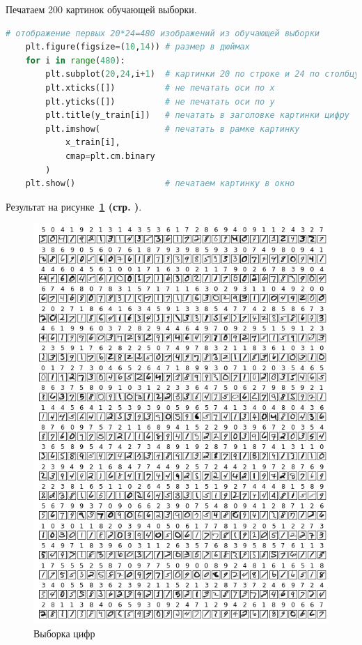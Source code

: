 Печатаем 200 картинок обучающей выборки.

\begin{lstlisting}[language=Python,]
    # отображение первых 20*24=480 изображений из обучающей выборки
    plt.figure(figsize=(10,14)) # размер в дюймах
    for i in range(480):
        plt.subplot(20,24,i+1)  # картинки 20 по строке и 24 по столбцу
        plt.xticks([])          # не печатать оси по x
        plt.yticks([])          # не печатать оси по y
        plt.title(y_train[i])   # печатать в заголовке картинки цифру
        plt.imshow(             # печатать в рамке картинку
            x_train[i],
            cmap=plt.cm.binary
        )  
    plt.show()                  # печатаем картинку в окно
\end{lstlisting}

Результат на рисунке~\textbf{\ref{fig:4_x_train} (стр. \pageref{fig:4_x_train})}.

\begin{figure}[!htbp]
    \centering
    \includegraphics[width=14.6cm]
    {../_INCLUDES/main/4/x_train.png}
    \caption{Выборка цифр}
    \label{fig:4_x_train}
\end{figure}



